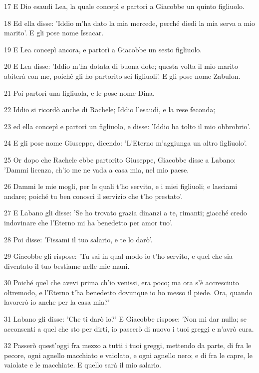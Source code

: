 \par 17 E Dio esaudì Lea, la quale concepì e partorì a Giacobbe un quinto figliuolo.
\par 18 Ed ella disse: 'Iddio m'ha dato la mia mercede, perché diedi la mia serva a mio marito'. E gli pose nome Issacar.
\par 19 E Lea concepì ancora, e partorì a Giacobbe un sesto figliuolo.
\par 20 E Lea disse: 'Iddio m'ha dotata di buona dote; questa volta il mio marito abiterà con me, poiché gli ho partorito sei figliuoli'. E gli pose nome Zabulon.
\par 21 Poi partorì una figliuola, e le pose nome Dina.
\par 22 Iddio si ricordò anche di Rachele; Iddio l'esaudì, e la rese feconda;
\par 23 ed ella concepì e partorì un figliuolo, e disse: 'Iddio ha tolto il mio obbrobrio'.
\par 24 E gli pose nome Giuseppe, dicendo: 'L'Eterno m'aggiunga un altro figliuolo'.
\par 25 Or dopo che Rachele ebbe partorito Giuseppe, Giacobbe disse a Labano: 'Dammi licenza, ch'io me ne vada a casa mia, nel mio paese.
\par 26 Dammi le mie mogli, per le quali t'ho servito, e i miei figliuoli; e lasciami andare; poiché tu ben conosci il servizio che t'ho prestato'.
\par 27 E Labano gli disse: 'Se ho trovato grazia dinanzi a te, rimanti; giacché credo indovinare che l'Eterno mi ha benedetto per amor tuo'.
\par 28 Poi disse: 'Fissami il tuo salario, e te lo darò'.
\par 29 Giacobbe gli rispose: 'Tu sai in qual modo io t'ho servito, e quel che sia diventato il tuo bestiame nelle mie mani.
\par 30 Poiché quel che avevi prima ch'io venissi, era poco; ma ora s'è accresciuto oltremodo, e l'Eterno t'ha benedetto dovunque io ho messo il piede. Ora, quando lavorerò io anche per la casa mia?'
\par 31 Labano gli disse: 'Che ti darò io?' E Giacobbe rispose: 'Non mi dar nulla; se acconsenti a quel che sto per dirti, io pascerò di nuovo i tuoi greggi e n'avrò cura.
\par 32 Passerò quest'oggi fra mezzo a tutti i tuoi greggi, mettendo da parte, di fra le pecore, ogni agnello macchiato e vaiolato, e ogni agnello nero; e di fra le capre, le vaiolate e le macchiate. E quello sarà il mio salario.
